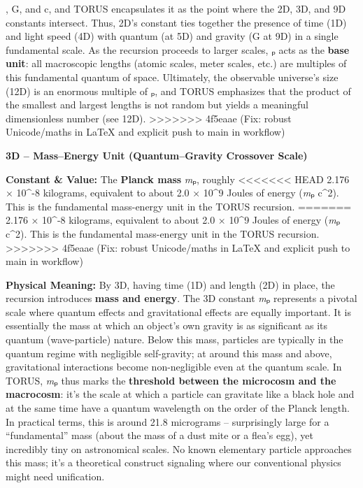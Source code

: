 \documentclass[]{article}
\begin{document}
\hbar, G, and c, and TORUS encapsulates it as the point where the 2D, 3D,
and 9D constants intersect. Thus, 2D's constant ties together the
presence of time (1D) and light speed (4D) with quantum (\hbar at 5D) and
gravity (G at 9D) in a single fundamental scale​. As the recursion
proceeds to larger scales, \emph{\ell}ₚ acts as the \textbf{base unit}: all
macroscopic lengths (atomic scales, meter scales, etc.) are multiples of
this fundamental quantum of space. Ultimately, the observable universe's
size (12D) is an enormous multiple of \emph{\ell}ₚ, and TORUS emphasizes
that the product of the smallest and largest lengths is not random but
yields a meaningful dimensionless number (see 12D)​.
>>>>>>> 4f5eaae (Fix: robust Unicode/maths in LaTeX and explicit push to main in workflow)

\textbf{3D -- Mass--Energy Unit (Quantum--Gravity Crossover Scale)}

\textbf{Constant \& Value:} The \textbf{Planck mass} \emph{m}ₚ, roughly
<<<<<<< HEAD
2.176 × 10\^{}-8 kilograms\hspace{0pt}, equivalent to about 2.0 ×
10\^{}9 Joules of energy (\emph{m}ₚ c\^{}2). This is the fundamental
mass-energy unit in the TORUS recursion.
=======
2.176 × 10\^{}-8 kilograms​, equivalent to about 2.0 × 10\^{}9 Joules of
energy (\emph{m}ₚ c\^{}2). This is the fundamental mass-energy unit in
the TORUS recursion.
>>>>>>> 4f5eaae (Fix: robust Unicode/maths in LaTeX and explicit push to main in workflow)

\textbf{Physical Meaning:} By 3D, having time (1D) and length (2D) in
place, the recursion introduces \textbf{mass and energy}. The 3D
constant \emph{m}ₚ represents a pivotal scale where quantum effects and
gravitational effects are equally important. It is essentially the mass
at which an object's own gravity is as significant as its quantum
(wave-particle) nature​. Below this mass, particles are typically in the
quantum regime with negligible self-gravity; at around this mass and
above, gravitational interactions become non-negligible even at the
quantum scale. In TORUS, \emph{m}ₚ thus marks the \textbf{threshold
between the microcosm and the macrocosm}​: it's the scale at which a
particle can gravitate like a black hole and at the same time have a
quantum wavelength on the order of the Planck length. In practical
terms, this is around 21.8 micrograms -- surprisingly large for a
``fundamental'' mass (about the mass of a dust mite or a flea's egg),
yet incredibly tiny on astronomical scales​. No known elementary
particle approaches this mass; it's a theoretical construct signaling
where our conventional physics might need unification.
\end{document}
